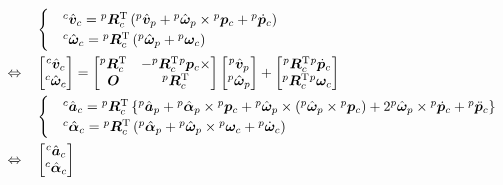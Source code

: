﻿\documentclass[a4paper]{jsarticle}
\begin{document}
\begin{align}
&\begin{cases}
&{}^{c}\hat{\bm{v}}_{c}={}^{p}\bm{R}_{c}^{\mathrm{T}}\left(
{}^{p}\hat{\bm{v}}_{p}
 +{}^{p}\hat{\bm{\omega}}_{p}\times{}^{p}\bm{p}_{c}
 +{}^{p}\dot{\bm{p}}_{c}
 \right) \\
&{}^{c}\hat{\bm{\omega}}_{c}={}^{p}\bm{R}_{c}^{\mathrm{T}}\left(
{}^{p}\hat{\bm{\omega}}_{p}+{}^{p}\bm{\omega}_{c}
\right)
\end{cases} \nonumber \\
\Leftrightarrow\quad&
\left[\begin{array}{@{}c@{}}
 {}^{c}\hat{\bm{v}}_{c} \\ {}^{c}\hat{\bm{\omega}}_{c}
\end{array}\right]
=
\left[\begin{array}{@{}cc@{}}
 {}^{p}\bm{R}_{c}^{\mathrm{T}} & -{}^{p}\bm{R}_{c}^{\mathrm{T}}{}^{p}\bm{p}_{c}\times \\
 \bm{O} & {}^{p}\bm{R}_{c}^{\mathrm{T}}
\end{array}\right]
 \left[\begin{array}{@{}c@{}}
  {}^{p}\hat{\bm{v}}_{p} \\ {}^{p}\hat{\bm{\omega}}_{p}
 \end{array}\right]
 +\left[\begin{array}{@{}c@{}}
  {}^{p}\bm{R}_{c}^{\mathrm{T}}{}^{p}\dot{\bm{p}}_{c} \\
  {}^{p}\bm{R}_{c}^{\mathrm{T}}{}^{p}\bm{\omega}_{c}
 \end{array}\right]
\label{eq:vel} \\
&\begin{cases}
&{}^{c}\hat{\bm{a}}_{c}={}^{p}\bm{R}_{c}^{\mathrm{T}}\left\{
{}^{p}\hat{\bm{a}}_{p}
 +{}^{p}\hat{\bm{\alpha}}_{p}\times{}^{p}\bm{p}_{c}
 +{}^{p}\hat{\bm{\omega}}_{p}\times({}^{p}\hat{\bm{\omega}}_{p}\times{}^{p}\bm{p}_{c})
 +2{}^{p}\hat{\bm{\omega}}_{p}\times{}^{p}\dot{\bm{p}}_{c}
 +{}^{p}\ddot{\bm{p}}_{c}
\right\} \\
&{}^{c}\hat{\bm{\alpha}}_{c}={}^{p}\bm{R}_{c}^{\mathrm{T}}\left(
 {}^{p}\hat{\bm{\alpha}}_{p}
 +{}^{p}\hat{\bm{\omega}}_{p}\times{}^{p}\bm{\omega}_{c}
 +{}^{p}\dot{\bm{\omega}}_{c}
\right)
\end{cases} \nonumber \\
\Leftrightarrow\quad&
\left[\begin{array}{@{}c@{}}
 {}^{c}\hat{\bm{a}}_{c} \\ {}^{c}\hat{\bm{\alpha}}_{c}
\end{array}\right]

\end{align}
\end{document}
